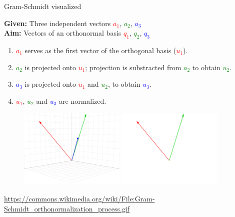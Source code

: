 \documentclass[11pt,compress,t,notes=noshow, xcolor=table]{beamer}
\begin{document}
\begin{vbframe}{Gram-Schmidt visualized}

\begin{scriptsize}

\textbf{Given:} Three independent vectors \textcolor{red}{$a_1$}, \textcolor{green}{$a_2$}, \textcolor{blue}{$a_3$} \\
\textbf{Aim:} Vectors of an orthonormal basis \textcolor{red}{$q_1$}, \textcolor{green}{$q_2$}, \textcolor{blue}{$q_3$}

\begin{enumerate}
  \item \textcolor{red}{$a_1$} serves as the first vector of the orthogonal basis (\textcolor{red}{$u_1$}).
  \item<2-> \textcolor{green}{$a_2$} is projected onto \textcolor{red}{$u_1$}; projection is substracted from \textcolor{green}{$a_2$}
        to obtain \textcolor{green}{$u_2$}.
  \item<3-> \textcolor{blue}{$a_3$} is projected onto \textcolor{red}{$u_1$} and \textcolor{green}{$u_2$},
        to obtain \textcolor{blue}{$u_3$}.
  \item<4-> \textcolor{red}{$u_1$}, \textcolor{green}{$u_2$} and \textcolor{blue}{$u_3$} are normalized.
\end{enumerate}

\end{scriptsize}

\begin{figure}
  \centering
  \includegraphics[width=0.45\textwidth]{figure_man/frame_010_delay-2s.png}
  \includegraphics[width=0.45\textwidth]{figure_man/frame_013_delay-1s.png}
\end{figure}
\tiny{\url{https://commons.wikimedia.org/wiki/File:Gram-Schmidt_orthonormalization_process.gif}}


\end{vbframe}
\end{document}

